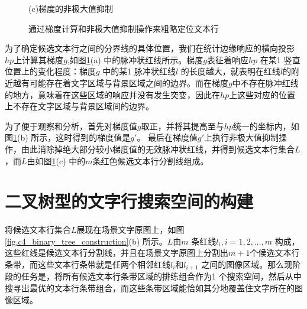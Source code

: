 \begin{figure}[htbp]
\begin{minipage}[t]{0.32\linewidth}
        \centerline{\small (c)梯度的非极大值抑制}
        \end{minipage}
        \caption{通过梯度计算和非极大值抑制操作来粗略定位文本行}
        \label{fig.c4_candidate_line_construction}
        \end{figure}

        为了确定候选文本行之间的分界线的具体位置，我们在统计边缘响应的横向投影$hp$上计算其梯度$g$,如图\ref{fig.c4_candidate_line_construction}(a) 中的脉冲状红线所示。梯度$g$表征着响应$hp$ 在某1 竖直位置上的变化程度：梯度$g$ 中的某1 脉冲状红线$l$ 的长度越大，就表明在红线$l$的附近越有可能存在着文字区域与背景区域之间的边界。而在梯度$g$中不存在脉冲红线的地方，意味着在这些区域的响应并没有发生突变，因此在$hp$上这些对应的位置上不存在文字区域与背景区域间的边界。

        为了便于观察和分析，首先对梯度值$g$取正，并将其提高至与$hp$统一的坐标内，如图\ref{fig.c4_candidate_line_construction}(b) 所示，这时得到的梯度值是$g$$'$。 最后在梯度值$g$$'$上执行非极大值抑制操作，由此消除掉绝大部分较小梯度值的无效脉冲状红线，并得到候选文本行集合$L$，而$L$由如图\ref{fig.c4_candidate_line_construction}(c) 中的$m$条红色候选文本行分割线组成。

    \section{二叉树型的文字行搜索空间的构建}

    将候选文本行集合$L$展现在场景文字原图上，如图\ref{fig.c4_binary_tree_construction}(b) 所示。$L$由$m$ 条红线$l_i, i=1,2,...,m$ 构成，这些红线是候选文本行分割线，并且在场景文字原图上分割出$m+1$个候选文本行条带，而这些文本行条带就是任两个相邻红线$l_i$和$l_{i+1}$ 之间的图像区域。那么现阶段的任务是，将所有候选文本行条带区域的排练组合作为1 个搜索空间，然后从中搜寻出最优的文本行条带组合，而这些条带区域能恰如其分地覆盖住文字所在的图像区域。

